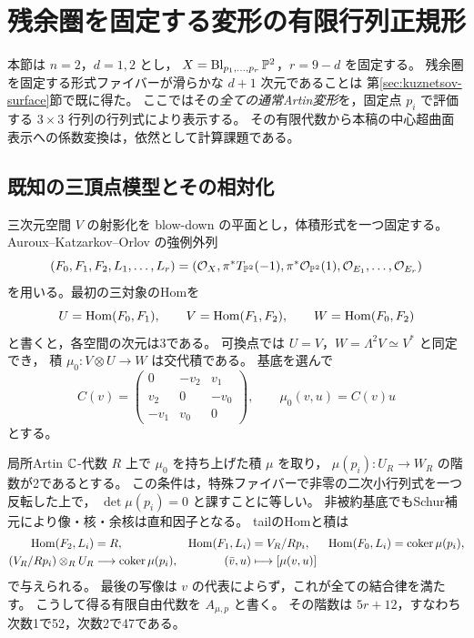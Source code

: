 \section{残余圏を固定する変形の有限行列正規形}
\label{sec:kuznetsov-gluing-normal-form}

本節は $n=2$，$d=1,2$ とし，
$X=\operatorname{Bl}_{p_1,\ldots,p_r}\mathbb P^2$，$r=9-d$ を固定する。
残余圏を固定する形式ファイバーが滑らかな $d+1$ 次元であることは
第\ref{sec:kuznetsov-surface}節で既に得た。
ここではその\emph{全ての通常Artin変形}を，固定点 $p_i$ で評価する
$3\times3$ 行列の行列式により表示する。
その有限代数から本稿の中心超曲面表示への係数変換は，依然として計算課題である。

\subsection{既知の三頂点模型とその相対化}

三次元空間 $V$ の射影化を blow-down の平面とし，体積形式を一つ固定する。
Auroux--Katzarkov--Orlov \cite[Theorem~2.5, \S\S2.1, 2.3]{AKO2006}
の強例外列
\[
 (F_0,F_1,F_2,L_1,\ldots,L_r)
 =
 (\mathcal O_X,\pi^*T_{\mathbb P^2}(-1),\pi^*\mathcal O_{\mathbb P^2}(1),
   \mathcal O_{E_1},\ldots,\mathcal O_{E_r})
\]
を用いる。最初の三対象のHomを
\[
 U=\operatorname{Hom}(F_0,F_1),\qquad V=\operatorname{Hom}(F_1,F_2),\qquad
 W=\operatorname{Hom}(F_0,F_2)
\]
と書くと，各空間の次元は3である。
可換点では $U=V$，$W=\Lambda^2V\simeq V^*$ と同定でき，
積 $\mu_0:V\otimes U\to W$ は交代積である。
基底を選んで
\[
 C(v)=
 \begin{pmatrix}
 0&-v_2&v_1\\ v_2&0&-v_0\\-v_1&v_0&0
 \end{pmatrix},
 \qquad \mu_0(v,u)=C(v)u
\]
とする。

局所Artin $\mathbb C$-代数 $R$ 上で $\mu_0$ を持ち上げた積 $\mu$ を取り，
$\mu(p_i):U_R\to W_R$ の階数が2であるとする。
この条件は，特殊ファイバーで非零の二次小行列式を一つ反転した上で，
$\det\mu(p_i)=0$ と課すことに等しい。
非被約基底でもSchur補元により像・核・余核は直和因子となる。
tailのHomと積は
\begin{equation}\label{eq:ku-gluing-tail}
 \begin{aligned}
 \operatorname{Hom}(F_2,L_i)&=R,&
 \operatorname{Hom}(F_1,L_i)&=V_R/Rp_i,&
 \operatorname{Hom}(F_0,L_i)&=\operatorname{coker}\mu(p_i),\\
 (V_R/Rp_i)\otimes_R U_R&\longrightarrow
       \operatorname{coker}\mu(p_i),&
 (\bar v,u)&\longmapsto[\mu(v,u)]
 \end{aligned}
\end{equation}
で与えられる。
最後の写像は $v$ の代表によらず，これが全ての結合律を満たす。
こうして得る有限自由代数を $A_{\mu,p}$ と書く。
その階数は $5r+12$，すなわち次数1で52，次数2で47である。

